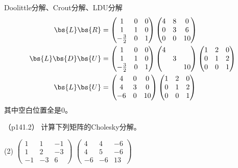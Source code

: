 \documentclass[12pt, a4paper, oneside, UTF8]{ctexbook}
\begin{document}
\begin{solution}
\begin{enumerate}[label=(\arabic*)]
    Doolittle分解、Crout分解、LDU分解
\begin{align*}
    \bs{L}\bs{R}&=
    \begin{pmatrix}
        1& 0 &0\\
        1&1&0\\
        -\frac{3}{2}&0&1
    \end{pmatrix}\begin{pmatrix}
        4 & 8&0\\
        0& 3 & 6\\
        0 & 0 &10
    \end{pmatrix}\\
    \bs{L}\bs{D}\bs{U}&=\begin{pmatrix}
        1& 0 &0\\
        1&1&0\\
        -\frac{3}{2}&0&1
    \end{pmatrix}
    \begin{pmatrix}
        4 & & \\
        & 3& \\
        & & 10
    \end{pmatrix}
    \begin{pmatrix}
        1 & 2 & 0\\
        0&1&2\\
        0 & 0& 1
    \end{pmatrix}\\
    \bs{L}\bs{U}&=
    \begin{pmatrix}
        4 & 0 & 0\\
        4&3&0\\
        -6 & 0& 10
    \end{pmatrix}
    \begin{pmatrix}
        1 & 2 & 0\\
        0&1&2\\
        0 & 0& 1
    \end{pmatrix}
\end{align*}
其中空白位置全是$0$。
    \end{enumerate}
\end{solution}

\begin{question}（p141.2）
    计算下列矩阵的Cholesky分解。
    \begin{tasks}[label=(\arabic*)](2)
        \task $\begin{pmatrix}
            1 & 1 & -1\\
            1&2&-3\\
            -1 & -3& 6
        \end{pmatrix}$
        \task $\begin{pmatrix}
            4 & 4&-6\\
            4& 5 & -6\\
            -6 & -6 &13
        \end{pmatrix}$
    \end{tasks}
\end{question}
\end{document}
